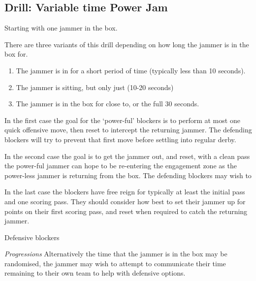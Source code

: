\subsection*{Drill: Variable time Power Jam}
\label{sec:power_jam/variable}


Starting with one jammer in the box. 

There are three variants of this drill depending on how long the jammer is in the box for.

\begin{enumerate}
\item The jammer is in for a short period of time (typically less than 10 seconds).  
\item The jammer is sitting, but only just (10-20 seconds) 
\item The jammer is in the box for close to, or the full 30 seconds. 
\end{enumerate}



In the first case the goal for the `power-ful' blockers is to perform at most one quick offensive move, then reset to intercept the returning jammer. 
The defending blockers will try to prevent that first move before settling into regular derby.   


In the second case the goal is to get the jammer out, and reset, with a clean pass the power-ful jammer can hope to be re-entering the engagement zone as the power-less jammer is returning from the box.
The defending blockers may wish to     



In the last case the blockers have free reign for typically at least the initial pass and one scoring pass.
They should consider how best to set their jammer up for points on their first scoring pass, and reset when required to catch the returning jammer.       

Defensive blockers 

{\it Progressions}
Alternatively the time that the jammer is in the box may be randomised, the jammer may wish to attempt to communicate their time remaining to their own team to help with defensive options. 
